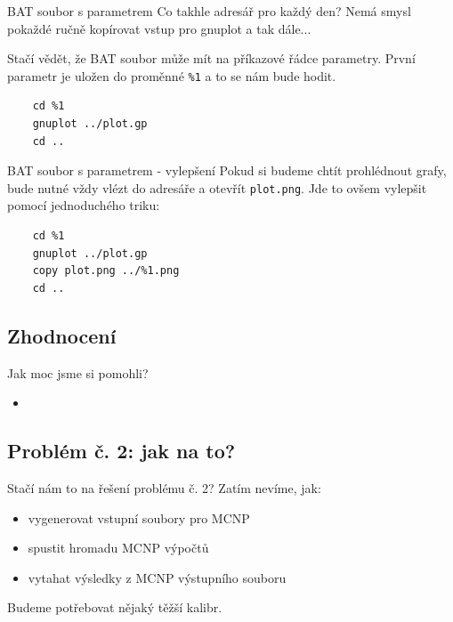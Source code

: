 \documentclass{beamer}
\begin{document}
\begin{frame}[fragile]{BAT soubor s parametrem}
  Co takhle adresář pro každý den? Nemá smysl pokaždé ručně kopírovat vstup pro gnuplot a tak dále... 
  
  Stačí vědět, že BAT soubor může mít na příkazové řádce parametry. První parametr je uložen do proměnné \texttt{\%1} a to se nám bude hodit.
  
  \begin{verbatim}
    cd %1
    gnuplot ../plot.gp
    cd ..
  \end{verbatim}
\end{frame}

\begin{frame}[fragile]{BAT soubor s parametrem - vylepšení}
  Pokud si budeme chtít prohlédnout grafy, bude nutné vždy vlézt do adresáře a otevřít \texttt{plot.png}. Jde to ovšem vylepšit pomocí jednoduchého triku:
  
  \begin{verbatim}
    cd %1
    gnuplot ../plot.gp
    copy plot.png ../%1.png
    cd ..
  \end{verbatim}
\end{frame}

\subsection{Zhodnocení}

\begin{frame}{Jak moc jsme si pomohli?}
  \begin{itemize}
    \item 
  \end{itemize}
\end{frame}

\subsection{Problém č. 2: jak na to?}

\begin{frame}{Stačí nám to na řešení problému č. 2?}
  Zatím nevíme, jak:
  \begin{itemize}
    \item vygenerovat vstupní soubory pro MCNP
    \item spustit hromadu MCNP výpočtů
    \item vytahat výsledky z MCNP výstupního souboru
  \end{itemize}
  Budeme potřebovat nějaký těžší kalibr.
\end{frame}
\end{document}
